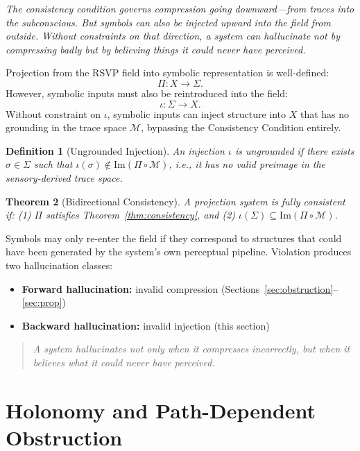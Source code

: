 \documentclass[12pt,a4paper]{article}
\newtheorem{theorem}{Theorem}[section]
\newtheorem{definition}[theorem]{Definition}
\begin{document}
\textit{The consistency condition governs compression going downward---from traces into the subconscious. But symbols can also be injected upward into the field from outside. Without constraints on that direction, a system can hallucinate not by compressing badly but by believing things it could never have perceived.}

Projection from the RSVP field into symbolic representation is well-defined:
\[
\Pi : X \rightarrow \Sigma.
\]
However, symbolic inputs must also be reintroduced into the field:
\[
\iota : \Sigma \rightarrow X.
\]
Without constraint on $\iota$, symbolic inputs can inject structure into $X$ that has no grounding in the trace space $\mathcal{M}$, bypassing the Consistency Condition entirely.

\begin{definition}[Ungrounded Injection]
An injection $\iota$ is ungrounded if there exists $\sigma \in \Sigma$ such that $\iota(\sigma) \notin \mathrm{Im}(\Pi \circ \mathcal{M})$, i.e., it has no valid preimage in the sensory-derived trace space.
\end{definition}

\begin{theorem}[Bidirectional Consistency]
\label{thm:bidirectional}
A projection system is fully consistent if: (1) $\Pi$ satisfies Theorem~\ref{thm:consistency}, and (2) $\iota(\Sigma) \subseteq \mathrm{Im}(\Pi \circ \mathcal{M})$.
\end{theorem}

Symbols may only re-enter the field if they correspond to structures that could have been generated by the system's own perceptual pipeline. Violation produces two hallucination classes:

\begin{itemize}[noitemsep]
\item \textbf{Forward hallucination:} invalid compression (Sections~\ref{sec:obstruction}--\ref{sec:prop})
\item \textbf{Backward hallucination:} invalid injection (this section)
\end{itemize}

\begin{quote}
\emph{A system hallucinates not only when it compresses incorrectly, but when it believes what it could never have perceived.}
\end{quote}

\section{Holonomy and Path-Dependent Obstruction}
\label{sec:holonomy}
\end{document}
